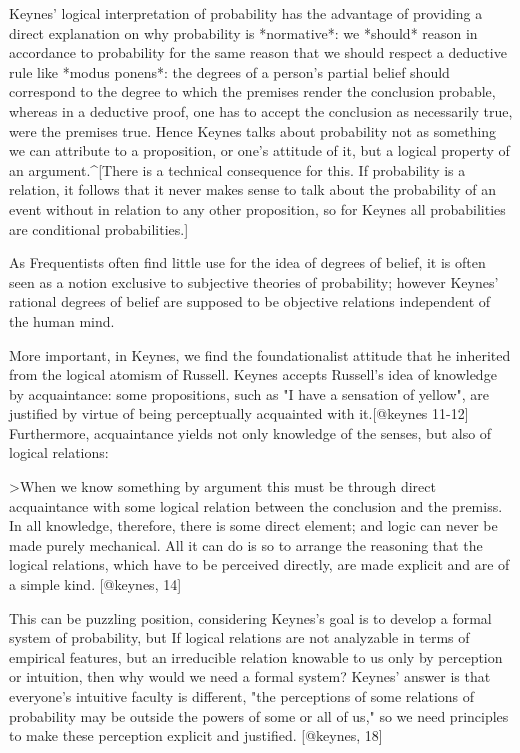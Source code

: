 Keynes' logical interpretation of probability has the advantage of
providing a direct explanation on why probability is *normative*: we
*should* reason in accordance to probability for the same reason that we
should respect a deductive rule like *modus ponens*: the degrees of a
person's partial belief should correspond to the degree to which the
premises render the conclusion probable, whereas in a deductive proof,
one has to accept the conclusion as necessarily true, were the premises
true. Hence Keynes talks about probability not as something we can
attribute to a proposition, or one's attitude of it, but a logical
property of an argument.\^{}{[}There is a technical consequence for
this. If probability is a relation, it follows that it never makes sense
to talk about the probability of an event without in relation to any
other proposition, so for Keynes all probabilities are conditional
probabilities.{]}

As Frequentists often find little use for the idea of degrees of belief,
it is often seen as a notion exclusive to subjective theories of
probability; however Keynes' rational degrees of belief are supposed to
be objective relations independent of the human mind.

More important, in Keynes, we find the foundationalist attitude that he
inherited from the logical atomism of Russell. Keynes accepts Russell's
idea of knowledge by acquaintance: some propositions, such as "I have a
sensation of yellow", are justified by virtue of being perceptually
acquainted with it.{[}@keynes 11-12{]} Furthermore, acquaintance yields
not only knowledge of the senses, but also of logical relations:

\textgreater{}When we know something by argument this must be through
direct acquaintance with some logical relation between the conclusion
and the premiss. In all knowledge, therefore, there is some direct
element; and logic can never be made purely mechanical. All it can do is
so to arrange the reasoning that the logical relations, which have to be
perceived directly, are made explicit and are of a simple kind.
{[}@keynes, 14{]}

This can be puzzling position, considering Keynes's goal is to develop a
formal system of probability, but If logical relations are not
analyzable in terms of empirical features, but an irreducible relation
knowable to us only by perception or intuition, then why would we need a
formal system? Keynes' answer is that everyone's intuitive faculty is
different, "the perceptions of some relations of probability may be
outside the powers of some or all of us," so we need principles to make
these perception explicit and justified. {[}@keynes, 18{]}

